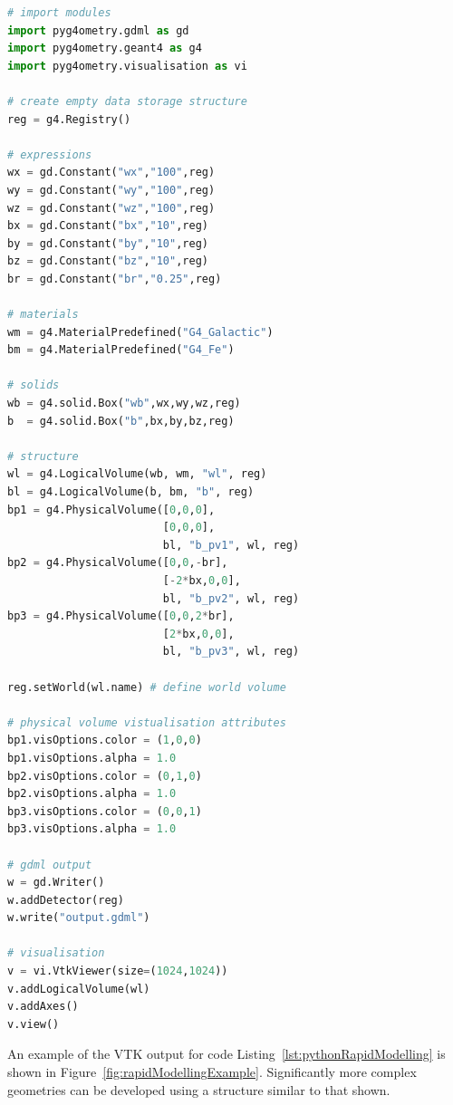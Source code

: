 \documentclass[final,5p,times,twocolumn]{elsarticle}
\newcommand{\PYGEOMETRY}{\textsc{Pyg4ometry}}
\begin{document}
\begin{lstlisting}[caption={A simple Python script using \PYGEOMETRY{} to create a simple Geant4 geometry.},label={lst:pythonRapidModelling}, language=Python]
# import modules
import pyg4ometry.gdml as gd
import pyg4ometry.geant4 as g4
import pyg4ometry.visualisation as vi

# create empty data storage structure
reg = g4.Registry()

# expressions
wx = gd.Constant("wx","100",reg)
wy = gd.Constant("wy","100",reg)
wz = gd.Constant("wz","100",reg)
bx = gd.Constant("bx","10",reg)
by = gd.Constant("by","10",reg)
bz = gd.Constant("bz","10",reg)
br = gd.Constant("br","0.25",reg)

# materials
wm = g4.MaterialPredefined("G4_Galactic")
bm = g4.MaterialPredefined("G4_Fe")

# solids
wb = g4.solid.Box("wb",wx,wy,wz,reg)
b  = g4.solid.Box("b",bx,by,bz,reg)

# structure
wl = g4.LogicalVolume(wb, wm, "wl", reg)
bl = g4.LogicalVolume(b, bm, "b", reg)
bp1 = g4.PhysicalVolume([0,0,0],
                        [0,0,0],
                        bl, "b_pv1", wl, reg)
bp2 = g4.PhysicalVolume([0,0,-br],
                        [-2*bx,0,0],
                        bl, "b_pv2", wl, reg)
bp3 = g4.PhysicalVolume([0,0,2*br],
                        [2*bx,0,0],
                        bl, "b_pv3", wl, reg)

reg.setWorld(wl.name) # define world volume

# physical volume vistualisation attributes
bp1.visOptions.color = (1,0,0)
bp1.visOptions.alpha = 1.0
bp2.visOptions.color = (0,1,0)
bp2.visOptions.alpha = 1.0
bp3.visOptions.color = (0,0,1)
bp3.visOptions.alpha = 1.0

# gdml output
w = gd.Writer()
w.addDetector(reg)
w.write("output.gdml")

# visualisation
v = vi.VtkViewer(size=(1024,1024))
v.addLogicalVolume(wl)
v.addAxes()
v.view()
\end{lstlisting}

An example of the VTK output for code
Listing~\ref{lst:pythonRapidModelling} is shown in
Figure~\ref{fig:rapidModellingExample}. Significantly more complex
geometries can be developed using a structure similar to that shown.
\end{document}
